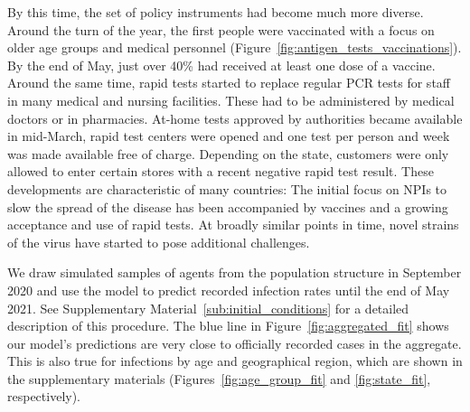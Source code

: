 \begin{figure}[!tp]
\end{figure}

By this time, the set of policy instruments had become much more diverse. Around the
turn of the year, the first people were vaccinated with a focus on older age groups and
medical personnel (Figure~\ref{fig:antigen_tests_vaccinations}). By the end of May, just
over 40\% had received at least one dose of a vaccine. Around the same time, rapid tests
started to replace regular PCR tests for staff in many medical and nursing facilities.
These had to be administered by medical doctors or in pharmacies. At-home tests approved
by authorities became available in mid-March, rapid test centers were opened and one
test per person and week was made available free of charge. Depending on the state,
customers were only allowed to enter certain stores with a recent negative rapid test
result. These developments are characteristic of many countries: The initial focus on
NPIs to slow the spread of the disease has been accompanied by vaccines and a growing
acceptance and use of rapid tests. At broadly similar points in time, novel strains of
the virus have started to pose additional challenges.

We draw simulated samples of agents from the population structure in September 2020 and
use the model to predict recorded infection rates until the end of May 2021. See
Supplementary Material~\ref{sub:initial_conditions} for a detailed description of this
procedure. The blue line in Figure~\ref{fig:aggregated_fit} shows our model's
predictions are very close to officially recorded cases in the aggregate. This is also
true for infections by age and geographical region, which are shown in the supplementary
materials (Figures~\ref{fig:age_group_fit} and \ref{fig:state_fit}, respectively).

